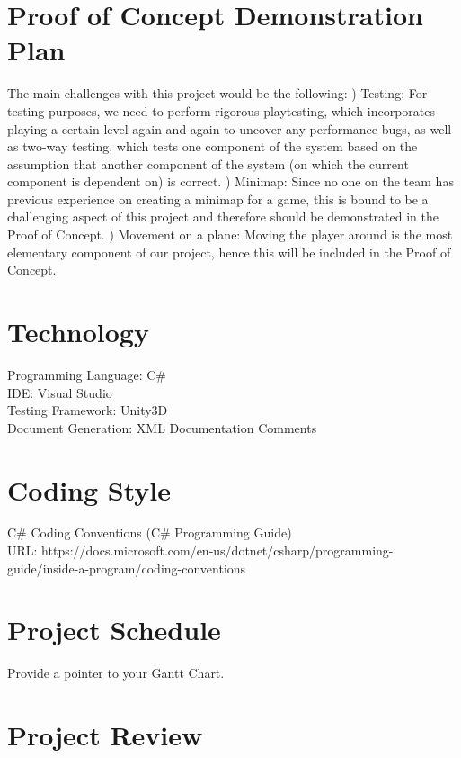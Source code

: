 \documentclass{article}
\begin{document}
\section{Proof of Concept Demonstration Plan}
The main challenges with this project would be the following: \newline
{}) Testing: For testing purposes, we need to perform rigorous playtesting, which incorporates playing a certain level again and again to uncover any performance bugs, as well as two-way testing, which tests one component of the system based on the assumption that another component of the system (on which the current component is dependent on) is correct.
\newline
{}) Minimap: Since no one on the team has previous experience on creating a minimap for a game, this is bound to be a challenging aspect of this project and therefore should be demonstrated in the Proof of Concept.
\newline
{}) Movement on a plane: Moving the player around is the most elementary component of our project, hence this will be included in the Proof of Concept.

\section{Technology}
Programming Language: C\# \\
IDE: Visual Studio\\
Testing Framework: Unity3D\\
Document Generation: XML Documentation Comments

\section{Coding Style}
C\# Coding Conventions (C\# Programming Guide)\\
URL: https://docs.microsoft.com/en-us/dotnet/csharp/programming-guide/inside-a-program/coding-conventions

\section{Project Schedule}

Provide a pointer to your Gantt Chart.

\section{Project Review}
\end{document}
